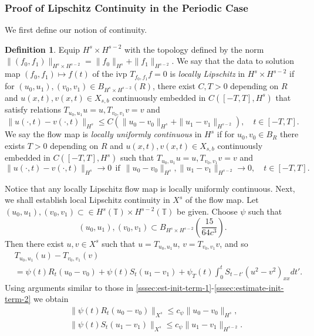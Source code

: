 \documentclass[12pt,reqno]{amsart}
\numberwithin{equation}{section}  %
\numberwithin{figure}{section}
\newcommand{\ci}{\mathbb{T}}
\theoremstyle{plain}
\theoremstyle{definition}
\newtheorem{definition}{Definition}
\theoremstyle{remark}
\begin{document}
\subsubsection{Proof of Lipschitz Continuity in the Periodic Case} 
\label{sssec:lip-continuity}
%
%
We first define our notion of continuity.
%
%
\begin{definition}
  Equip $H^{s} \times H^{s-2}$ with the 
  topology defined by the norm $\|(f_0, f_1)\|_{H^{s} \times H^{s-2}}
  = \|f_0\|_{H^{s}} + \|f_1\|_{H^{s-2}}$.
  We say that the data to solution
  map $(f_0, f_1) \mapsto f(t)$ of the ivp $T_{f_0, f_1} f =
  0$ is \emph{locally Lipschitz} in $H^{s} \times H^{s-2}$ if for
  $(u_0, u_1), (v_0, v_1) \in B_{H^{s} \times H^{s-2}}(R)$,
  there exist $C, T>0$ depending on $R$ and 
  $u(x,t), v(x,t) \in X_{s,b}$ continuously embedded in $C([-T, T], H^{s})$
  that satisfy relations $T_{u_0, u_1}u=u, T_{v_0, v_1}v=v$ and
	$$\|u(\cdot, t) - v(\cdot, t)
  \|_{H^{s}} \le C \left( \|u_{0} - v_0 \|_{H^{s}} + \|u_{1} - v_1 \|_{H^{s-2}}
  \right), \quad t \in [-T, T].$$ We
	say the flow map is \emph{locally uniformly
	continuous} in $H^{s}$ if for
	$u_0, v_0 \in B_R$ there exists $T >0$ depending on $R$ and 
  $u(x,t), v(x,t) \in X_{s,b}$ continuously embedded in $C([-T, T], H^{s})$
  such that  $T_{u_0, u_1}u=u, T_{v_0, v_1}v=v$ and
 	$$ \|u(\cdot, t) - v(\cdot, t) \|_{H^{s}} \to
  0 \ \ \text{if}  \ \ \|u_0 - v_0 \|_{H^{s}}, \|u_1 - v_1 \|_{H^{s-2}} \to 0, \quad
  t \in
  [-T, T]. $$ 
\end{definition}
%
%
Notice that any locally Lipschitz flow map is locally uniformly continuous. 
Next, we shall establish local Lipschitz continuity in $X^{s}$ of the flow
map. Let $(u_0, u_1), (v_0, v_1) \subset \in H^{s}(\ci) \times H^{s-2}(\ci)  $
be given. Choose $\psi$ such that $$(u_0, u_1), (v_0, v_1)  \subset
B_{H^{s} \times H^{s-2}}(\frac{15}{64c^{3}}).$$ Then there exist $u, v \in X^{s}$ such that $u =
T_{u_0, u_1}u$, $v = T_{v_0, v_1} v$, and so
%
%
\begin{equation}
	\label{gen-1a}
	\begin{split}
    & T_{u_0, u_1}(u) - T_{v_0, v_1}(v)
		\\
    & = \psi(t ) R_{t}(u_{0} - v_0) + \psi(t) S_{t}(u_{1} - v_1)
    + \psi_{T}(t) \int_{0}^{t} S_{t-t'}
    (u^{2} - v^{2} )_{xx} dt'.
		\end{split}
\end{equation}
%
%
Using arguments similar to those in 
\autoref{sssec:est-init-term-1}-\autoref{sssec:estimate-init-term-2}
we obtain
%
%
\begin{equation}
	\label{gen-2a}
	\begin{split}
		& \| \psi(t ) R_t (u_0 - v_0)\|_{X^{s}}
		\le c_{\psi} \|u_0 -v_0\|_{H^s},
    \\
    & \| \psi(t) S_t (u_1 - v_1)\|_{X^{s}}
    \le c_{\psi} \|u_1 -v_1\|_{H^{s-2}}.
	\end{split}
\end{equation}
\end{document}
